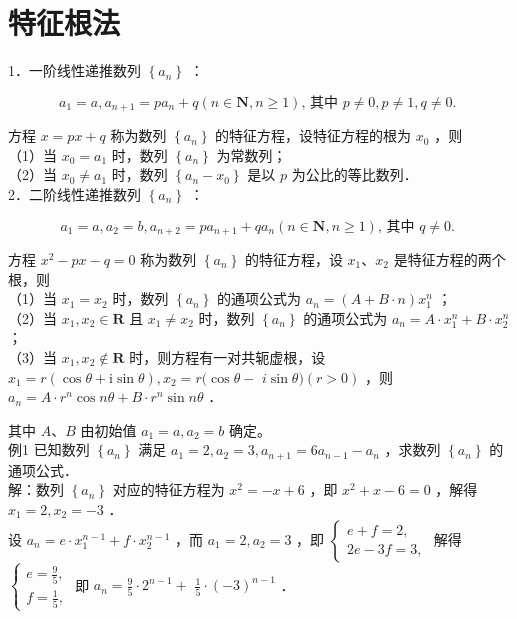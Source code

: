 \documentclass[10pt]{article}
\begin{document}
\section*{特征根法}
1．一阶线性递推数列 \(\left\{a_{n}\right\}\) ：

\[
a_{1}=a, a_{n+1}=p a_{n}+q(n \in \mathbf{N}, n \geqslant 1) \text {, 其中 } p \neq 0, p \neq 1, q \neq 0 \text {. }
\]

方程 \(x=p x+q\) 称为数列 \(\left\{a_{n}\right\}\) 的特征方程，设特征方程的根为 \(x_{0}\) ，则\\
（1）当 \(x_{0}=a_{1}\) 时，数列 \(\left\{a_{n}\right\}\) 为常数列；\\
（2）当 \(x_{0} \neq a_{1}\) 时，数列 \(\left\{a_{n}-x_{0}\right\}\) 是以 \(p\) 为公比的等比数列．\\
2．二阶线性递推数列 \(\left\{a_{n}\right\}\) ：

\[
a_{1}=a, a_{2}=b, a_{n+2}=p a_{n+1}+q a_{n}(n \in \mathbf{N}, n \geqslant 1) \text {, 其中 } q \neq 0 \text {. }
\]

方程 \(x^{2}-p x-q=0\) 称为数列 \(\left\{a_{n}\right\}\) 的特征方程，设 \(x_{1} 、 x_{2}\) 是特征方程的两个根，则\\
（1）当 \(x_{1}=x_{2}\) 时，数列 \(\left\{a_{n}\right\}\) 的通项公式为 \(a_{n}=(A+B \cdot n) x_{1}^{n}\) ；\\
（2）当 \(x_{1}, x_{2} \in \mathbf{R}\) 且 \(x_{1} \neq x_{2}\) 时，数列 \(\left\{a_{n}\right\}\) 的通项公式为 \(a_{n}=A \cdot x_{1}^{n}+B \cdot x_{2}^{n}\) ；\\
（3）当 \(x_{1}, x_{2} \notin \mathbf{R}\) 时，则方程有一对共轭虚根，设 \(x_{1}=r(\cos \theta+\mathrm{i} \sin \theta), x_{2}=r(\cos \theta-\) \(i \sin \theta)(r>0)\) ，则 \(a_{n}=A \cdot r^{n} \cos n \theta+B \cdot r^{n} \sin n \theta\) ．

其中 \(A 、 B\) 由初始值 \(a_{1}=a, a_{2}=b\) 确定。\\
例1 已知数列 \(\left\{a_{n}\right\}\) 满足 \(a_{1}=2, a_{2}=3, a_{n+1}=6 a_{n-1}-a_{n}\) ，求数列 \(\left\{a_{n}\right\}\) 的通项公式．\\
解：数列 \(\left\{a_{n}\right\}\) 对应的特征方程为 \(x^{2}=-x+6\) ，即 \(x^{2}+x-6=0\) ，解得 \(x_{1}=2, x_{2}=-3\) ．\\
设 \(a_{n}=e \cdot x_{1}^{n-1}+f \cdot x_{2}^{n-1}\) ，而 \(a_{1}=2, a_{2}=3\) ，即 \(\left\{\begin{array}{l}e+f=2, \\ 2 e-3 f=3,\end{array}\right.\) 解得 \(\left\{\begin{array}{l}e=\frac{9}{5}, \\ f=\frac{1}{5},\end{array}\right.\) 即 \(a_{n}=\frac{9}{5} \cdot 2^{n-1}+\) \(\frac{1}{5} \cdot(-3)^{n-1}\) ．
\end{document}
